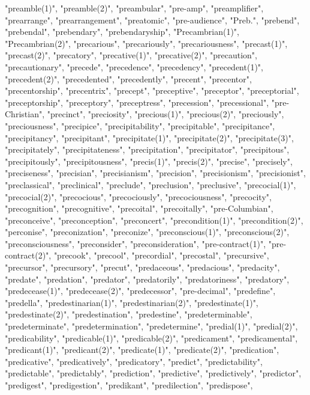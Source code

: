 "preamble(1)",
"preamble(2)",
"preambular",
"pre-amp",
"preamplifier",
"prearrange",
"prearrangement",
"preatomic",
"pre-audience",
"Preb.",
"prebend",
"prebendal",
"prebendary",
"prebendaryship",
"Precambrian(1)",
"Precambrian(2)",
"precarious",
"precariously",
"precariousness",
"precast(1)",
"precast(2)",
"precatory",
"precative(1)",
"precative(2)",
"precaution",
"precautionary",
"precede",
"precedence",
"precedency",
"precedent(1)",
"precedent(2)",
"precedented",
"precedently",
"precent",
"precentor",
"precentorship",
"precentrix",
"precept",
"preceptive",
"preceptor",
"preceptorial",
"preceptorship",
"preceptory",
"preceptress",
"precession",
"precessional",
"pre-Christian",
"precinct",
"preciosity",
"precious(1)",
"precious(2)",
"preciously",
"preciousness",
"precipice",
"precipitability",
"precipitable",
"precipitance",
"precipitancy",
"precipitant",
"precipitate(1)",
"precipitate(2)",
"precipitate(3)",
"precipitately",
"precipitateness",
"precipitation",
"precipitator",
"precipitous",
"precipitously",
"precipitousness",
"precis(1)",
"precis(2)",
"precise",
"precisely",
"preciseness",
"precisian",
"precisianism",
"precision",
"precisionism",
"precisionist",
"preclassical",
"preclinical",
"preclude",
"preclusion",
"preclusive",
"precocial(1)",
"precocial(2)",
"precocious",
"precociously",
"precociousness",
"precocity",
"precognition",
"precognitive",
"precoital",
"precoitally",
"pre-Columbian",
"preconceive",
"preconception",
"preconcert",
"precondition(1)",
"precondition(2)",
"perconise",
"preconization",
"preconize",
"preconscious(1)",
"preconscious(2)",
"preconsciousness",
"preconsider",
"preconsideration",
"pre-contract(1)",
"pre-contract(2)",
"precook",
"precool",
"precordial",
"precostal",
"precursive",
"precursor",
"precursory",
"precut",
"predaceous",
"predacious",
"predacity",
"predate",
"predation",
"predator",
"predatorily",
"predatoriness",
"predatory",
"predecease(1)",
"predecease(2)",
"predecessor",
"pre-decimal",
"predefine",
"predella",
"predestinarian(1)",
"predestinarian(2)",
"predestinate(1)",
"predestinate(2)",
"predestination",
"predestine",
"predeterminable",
"predeterminate",
"predetermination",
"predetermine",
"predial(1)",
"predial(2)",
"predicability",
"predicable(1)",
"predicable(2)",
"predicament",
"predicamental",
"predicant(1)",
"predicant(2)",
"predicate(1)",
"predicate(2)",
"predication",
"predicative",
"predicatively",
"predicatory",
"predict",
"predictability",
"predictable",
"predictably",
"prediction",
"predictive",
"predictively",
"predictor",
"predigest",
"predigestion",
"predikant",
"predilection",
"predispose",
